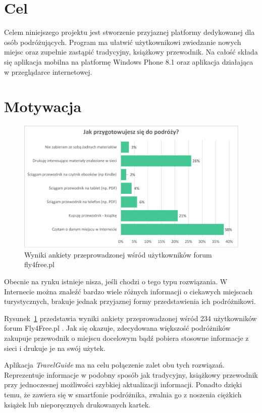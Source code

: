 \documentclass{book}
\newcommand{\appName}{\emph{TravelGuide} }
\begin{document}
		\section{Cel}
		Celem niniejszego projektu jest stworzenie przyjaznej platformy dedykowanej dla osób podróżujących. Program ma ułatwić użytkownikowi zwiedzanie nowych miejsc oraz zupełnie zastąpić tradycyjny, książkowy przewodnik. Na całość składa się aplikacja mobilna na platformę Windows Phone 8.1 oraz aplikacja działająca w przeglądarce internetowej. 

		\section{Motywacja}
	
		\begin{figure}		
			\centering
			\includegraphics[width=1.0\textwidth]{images/fly4freeAnkieta.pdf}
			\caption{Wyniki ankiety przeprowadzonej wśród użytkowników forum fly4free.pl}
			\label{fig:fly4freeAnkieta}
		\end{figure}
	
		Obecnie na rynku istnieje nisza, jeśli chodzi o tego typu rozwiązania. W Internecie można znaleźć bardzo wiele różnych informacji o ciekawych miejscach turystycznych, brakuje jednak przyjaznej formy przedstawienia ich podróżnikowi. 
		
		Rysunek~\ref{fig:fly4freeAnkieta} przedstawia wyniki ankiety przeprowadzonej wśród 234 użytkowników forum Fly4Free.pl \cite{id:fly4free}. Jak się okazuje, zdecydowana większość podróżników zakupuje przewodnik o miejscu docelowym bądź pobiera stosowne informacje z sieci i drukuje je na swój użytek.
		
		Aplikacja \appName ma na celu połączenie zalet obu tych rozwiązań. Reprezentuje informacje w podobny sposób jak tradycyjny, książkowy przewodnik przy jednoczesnej możliwości szybkiej aktualizacji informacji. Ponadto dzięki temu, że zawiera się w smartfonie podróżnika, zwalnia go z noszenia ciężkich książek lub nieporęcznych drukowanych kartek. 
			
\end{document}
